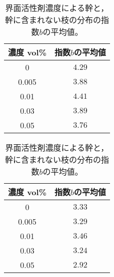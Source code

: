 \documentclass[autodetect-engine,dvi=dvipdfmx,a4paper,ja=standard,oneside,openany,11pt]{bxjsbook}
\begin{document}
\begin{table}[htbp]
  \begin{minipage}{0.45\textwidth}
    \centering
    \caption{界面活性剤濃度による普通の枝の分布の指数$b$の平均値。}
    \begin{tabular}{|c|c|}
      \hline
      濃度 vol\% & 指数$b$の平均値 \\ \hline\hline
      0        & $4.29$    \\ \hline
      0.005    & $3.88$    \\ \hline
      0.01     & $4.41$    \\ \hline
      0.03     & $3.89$    \\ \hline
      0.05     & $3.76$    \\
      \hline
    \end{tabular}
    \label{tab:brnch_len_exp}
  \end{minipage}
  \hfill
  \begin{minipage}{0.45\textwidth}
    \centering
    \caption{界面活性剤濃度による幹と，幹に含まれない枝の分布の指数$b$の平均値。}
    \begin{tabular}{|c|c|}
      \hline
      濃度 vol\% & 指数$b$の平均値 \\ \hline\hline
      0        & $3.33$    \\ \hline
      0.005    & $3.29$    \\ \hline
      0.01     & $3.46$    \\ \hline
      0.03     & $3.24$    \\ \hline
      0.05     & $2.92$    \\
      \hline
    \end{tabular}
    \label{tab:branch_len_exp_edited}
  \end{minipage}
\end{table}
\end{document}
